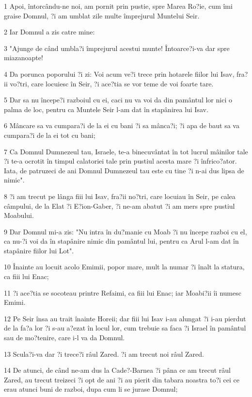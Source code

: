 \par 1 Apoi, întorcându-ne noi, am pornit prin pustie, spre Marea Ro?ie, cum îmi graise Domnul, ?i am umblat zile multe împrejurul Muntelui Seir.
\par 2 Iar Domnul a zis catre mine:
\par 3 "Ajunge de când umbla?i împrejurul acestui munte! Întoarce?i-va dar spre miazanoapte!
\par 4 Da porunca poporului ?i zi: Voi acum ve?i trece prin hotarele fiilor lui Isav, fra?ii vo?tri, care locuiesc în Seir, ?i ace?tia se vor teme de voi foarte tare.
\par 5 Dar sa nu începe?i razboiul cu ei, caci nu va voi da din pamântul lor nici o palma de loc, pentru ca Muntele Seir l-am dat în stapânirea lui Isav.
\par 6 Mâncare sa va cumpara?i de la ei cu bani ?i sa mânca?i; ?i apa de baut sa va cumpara?i de la ei tot cu bani;
\par 7 Ca Domnul Dumnezeul tau, Israele, te-a binecuvântat în tot lucrul mâinilor tale ?i te-a ocrotit în timpul calatoriei tale prin pustiul acesta mare ?i înfrico?ator. Iata, de patruzeci de ani Domnul Dumnezeul tau este cu tine ?i n-ai dus lipsa de nimic".
\par 8 ?i am trecut pe lânga fiii lui Isav, fra?ii no?tri, care locuiau în Seir, pe calea câmpului, de la Elat ?i E?ion-Gaber, ?i ne-am abatut ?i am mers spre pustiul Moabului.
\par 9 Dar Domnul mi-a zis: "Nu intra în du?manie cu Moab ?i nu începe razboi cu el, ca nu-?i voi da în stapânire nimic din pamântul lui, pentru ca Arul l-am dat în stapânire fiilor lui Lot".
\par 10 Înainte au locuit acolo Emimii, popor mare, mult la numar ?i înalt la statura, ca fiii lui Enac;
\par 11 ?i ace?tia se socoteau printre Refaimi, ca fiii lui Enac; iar Moabi?ii îi numesc Emimi.
\par 12 Pe Seir însa au trait înainte Horeii; dar fiii lui Isav i-au alungat ?i i-au pierdut de la fa?a lor ?i s-au a?ezat în locul lor, cum trebuie sa faca ?i Israel în pamântul sau de mo?tenire, care i-l va da Domnul.
\par 13 Scula?i-va dar ?i trece?i râul Zared. ?i am trecut noi râul Zared.
\par 14 De atunci, de când ne-am dus la Cade?-Barnea ?i pâna ce am trecut râul Zared, au trecut treizeci ?i opt de ani ?i au pierit din tabara noastra to?i cei ce erau atunci buni de razboi, dupa cum li se jurase Domnul;
